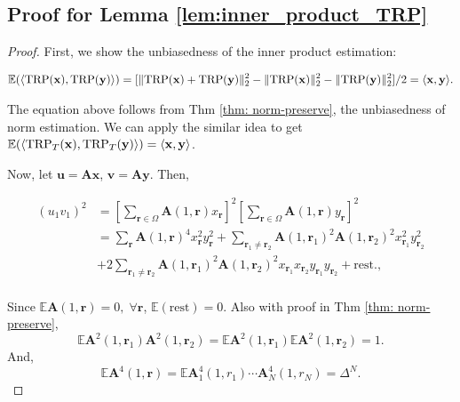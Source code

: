 \subsection*{Proof for Lemma \ref{lem:inner_product_TRP}} 
\begin{proof}
First, we show the unbiasedness of the inner product estimation: 

\begin{equation} \label{eq: inner_prod_unbias}
\begin{aligned}
\mathbb{E}(\langle \textup{TRP}(\mathbf{x}),\textup{TRP}(
\mathbf{y})\rangle) = [ \| \textup{TRP}(\mathbf{x}) + \textup{TRP}(\mathbf{y})\|_2^2 - \| \textup{TRP}(\mathbf{x})\|_2^2 -  \| \textup{TRP}(\mathbf{y})\|_2^2  ]/2  = \langle \mathbf{x}, \mathbf{y} \rangle.
\nonumber
\end{aligned} 
\end{equation}


The equation above follows from Thm \ref{thm: norm-preserve}, the unbiasedness of norm estimation. We can apply the similar idea to get $\mathbb{E}(\langle \textup{TRP}_T(\mathbf{x}),\textup{TRP}_T(
\mathbf{y})\rangle) = \langle \mathbf{x}, \mathbf{y}\rangle$. 

Now, let $\mathbf{u} = \mathbf{A}\mathbf{x}$, $\mathbf{v} = \mathbf{A}\mathbf{y}$. Then, 

\begin{equation*}
\begin{aligned}
(u_1 v_1)^2 &= [\sum_{\mathbf{r} \in \Omega} \mathbf{A}(1,\mathbf{r}) x_\mathbf{r}]^2 [\sum_{\mathbf{r} \in \Omega} \mathbf{A}(1,\mathbf{r}) 
y_\mathbf{r}]^2 \\  
&= \sum_{\mathbf{r}} \mathbf{A}(1,\mathbf{r})^4 x_{\mathbf{r}}^2 y_{\mathbf{r}}^2 +
 \sum_{\mathbf{r}_1 \neq \mathbf{r}_2} \mathbf{A}(1, \mathbf{r}_1)^2 \mathbf{A}(1, \mathbf{r}_2)^2 x_{\mathbf{r}_1}^2 y_{\mathbf{r}_2}^2 \\
&+ 2\sum_{\mathbf{r}_1 \neq \mathbf{r}_2 } \mathbf{A}(1, \mathbf{r}_1)^2 \mathbf{A}(1, \mathbf{r}_2)^2 x_{\mathbf{r}_1} x_{\mathbf{r}_2} y_{\mathbf{r}_1} y_{\mathbf{r}_2} + \text{rest} .,\\
\end{aligned}
\end{equation*} 

Since $\mathbb{E} \mathbf{A}(1,\mathbf{r}) = 0, \; \forall \mathbf{r}$, $\mathbb{E}(\text{rest}) = 0$. Also with proof in Thm \ref{thm: norm-preserve}, 
\[
\mathbb{E} \mathbf{A}^2(1,\mathbf{r}_1)\mathbf{A}^2(1,\mathbf{r}_2) = \mathbb{E} \mathbf{A}^2(1,\mathbf{r}_1) \mathbb{E}  \mathbf{A}^2(1,\mathbf{r}_2)  = 1.
\]
And, 
\[
\mathbb{E} \mathbf{A}^4(1,\mathbf{r}) = \mathbb{E} \mathbf{A}^4_1 (1, r_1) \cdots \mathbf{A}^4_N(1, r_N) = \Delta^N. 
\]


\end{proof}
